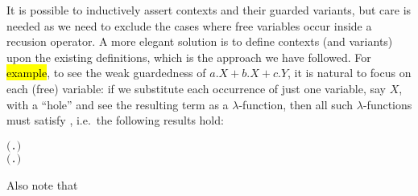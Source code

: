 It is possible to inductively assert \multivariate contexts and their
guarded variants, but care is needed as  we need to exclude the cases where
free variables occur inside a recusion operator. A more elegant
 solution is to define \multivariate contexts (and variants) upon the
existing \univariate definitions, which is the approach we have followed.
For \hl{example}, to see the weak guardedness of $a.X + b.X + c.Y$, it is
natural to focus on each (free) variable: if we substitute each
occurrence of just one variable, say $X$, with a ``hole'' and see the
resulting term as a $\lambda$-function, then all such $\lambda$-functions
must satisfy , i.e.~the following results hold:
\begin{alltt}
\HOLTokenTurnstile{}  \ensuremath{(}\HOLTokenLambda{}. \HOLSymConst{\ensuremath{\ldotp}} \HOLSymConst{\ensuremath{+}} \HOLSymConst{\ensuremath{\ldotp}} \HOLSymConst{\ensuremath{+}} \HOLSymConst{\ensuremath{\ldotp}} \ensuremath{)}
\HOLTokenTurnstile{}  \ensuremath{(}\HOLTokenLambda{}. \HOLSymConst{\ensuremath{\ldotp}}  \HOLSymConst{\ensuremath{+}} \HOLSymConst{\ensuremath{\ldotp}}  \HOLSymConst{\ensuremath{+}} \HOLSymConst{\ensuremath{\ldotp}}\ensuremath{)}
\end{alltt}
Also note that 

